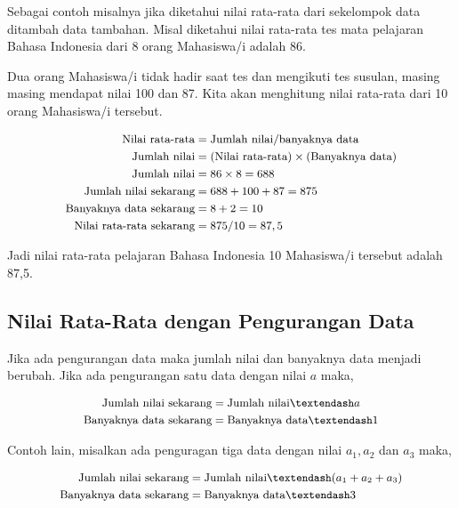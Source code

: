 \documentclass[
]{book}
\begin{document}
Sebagai contoh misalnya jika diketahui nilai rata-rata dari sekelompok data ditambah data tambahan. Misal diketahui nilai rata-rata tes mata pelajaran Bahasa Indonesia dari 8 orang Mahasiswa/i adalah 86.

Dua orang Mahasiswa/i tidak hadir saat tes dan mengikuti tes susulan, masing masing mendapat nilai 100 dan 87. Kita akan menghitung nilai rata-rata dari 10 orang Mahasiswa/i tersebut.

\[
\small{
\begin{aligned}
\text{Nilai rata-rata} & = \text{Jumlah nilai/banyaknya data} \\
\text{Jumlah nilai} & = \text{(Nilai rata-rata)} \times \text{(Banyaknya data)} \\
\text{Jumlah nilai} & = 86 \times 8 = 688 \\
\text{Jumlah nilai sekarang} & = 688 + 100 + 87 = 875 \\
\text{Banyaknya data sekarang} & = 8 + 2 = 10 \\
\text{Nilai rata-rata sekarang} &= 875 / 10 = 87,5
\end{aligned}
}
\]

Jadi nilai rata-rata pelajaran Bahasa Indonesia 10 Mahasiswa/i tersebut adalah 87,5.

\hypertarget{nilai-rata-rata-dengan-pengurangan-data}{%
\subsection{Nilai Rata-Rata dengan Pengurangan Data}\label{nilai-rata-rata-dengan-pengurangan-data}}

Jika ada pengurangan data maka jumlah nilai dan banyaknya data menjadi berubah. Jika ada pengurangan satu data dengan nilai \(a\) maka,

\[
\small{
\begin{aligned}
\text{Jumlah nilai sekarang}  & = \text{Jumlah nilai} – a\\
\text{Banyaknya data sekarang}& = \text{Banyaknya data} – 1
\end{aligned}
}
\]

Contoh lain, misalkan ada penguragan tiga data dengan nilai \(a_1 , a_2\) dan \(a_3\) maka,

\[
\small{
\begin{aligned}
\text{Jumlah nilai sekarang} &= \text{Jumlah nilai} – (a_1 + a_2 + a_3) \\
\text{Banyaknya data sekarang}& = \text{Banyaknya data} – 3
\end{aligned}
}
\]
\end{document}
